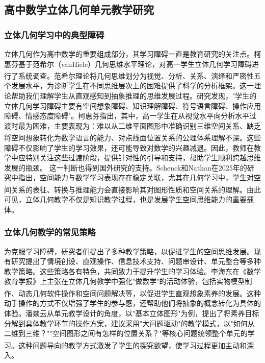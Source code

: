 \documentclass[UTF8,a4paper,12pt,twoside]{ctexart}
\begin{document}
\subsection{高中数学立体几何单元教学研究}

\subsubsection{立体几何学习中的典型障碍}
立体几何作为高中数学的重要组成部分，其学习障碍一直是教育研究的关注点。柯惠芬基于范希尔（vanHiele）几何思维水平理论，对高一学生立体几何学习障碍进行了系统调查\textsuperscript{\cite{ke2025}}。范希尔理论将几何思维划分为视觉、分析、关系、演绎和严密性五个发展水平，为诊断学生在不同思维层次上的困难提供了科学的分析框架。这一理论帮助我们理解学生从直观感知到抽象推理的思维发展过程。研究发现，"学生的立体几何学习障碍主要有空间想象障碍、知识理解障碍、符号语言障碍、操作应用障碍、情感态度障碍"。柯惠芬指出，其中，高一学生在从视觉水平向分析水平过渡时最为困难，主要表现为：难以从二维平面图形中准确识别三维空间关系、缺乏将空间想象转化为数学语言的能力、对点线面位置关系的公理体系理解不深\textsuperscript{\cite{ke2025}}。这些障碍不仅影响了学生的学习效果，还可能导致对数学的兴趣减退。因此，教师在教学中应特别关注这些过渡阶段，提供针对性的引导和支持，帮助学生顺利跨越思维发展的瓶颈。
这一判断也得到国外研究的支持。Schenck和Nathan在2025年的研究中指出，空间能力与数学学习表现存在稳定关联，尤其在几何学习中，学生对空间关系的表征、转换与推理能力会直接影响其对图形性质和空间关系的理解\textsuperscript{\cite{schenck}}。由此可见，立体几何教学不仅是知识教学过程，也是发展学生空间思维能力的重要载体。

\subsubsection{立体几何教学的常见策略}
为克服学习障碍，研究者们提出了多种教学策略，以促进学生的空间思维发展。现有研究提出了情境创设、直观操作、信息技术支持、问题串设计、单元整合等多种教学策略。这些策略各有特色，共同致力于提升学生的学习体验。李海东在《数学教育学报》上主张在立体几何教学中强化"做数学"的活动体验，包括实物模型制作、动态几何软件操作和空间问题解决等，以促进学生直观想象素养的发展\textsuperscript{\cite{li2019}}。这种动手操作的方式不仅增强了学生的参与感，还帮助他们将抽象的概念转化为具体的体验。潘燚云从单元教学设计的角度，以"基本立体图形"为例，提出了将素养目标分解到具体教学环节的操作方案，建议采用"大问题驱动"的教学模式，以"如何从二维到三维？""空间图形之间有怎样的位置关系？"等核心问题统领整个单元的学习\textsuperscript{\cite{pan2025}}。这种问题导向的教学方式激发了学生的探究欲望，使学习过程更加主动和深入。
\end{document}
